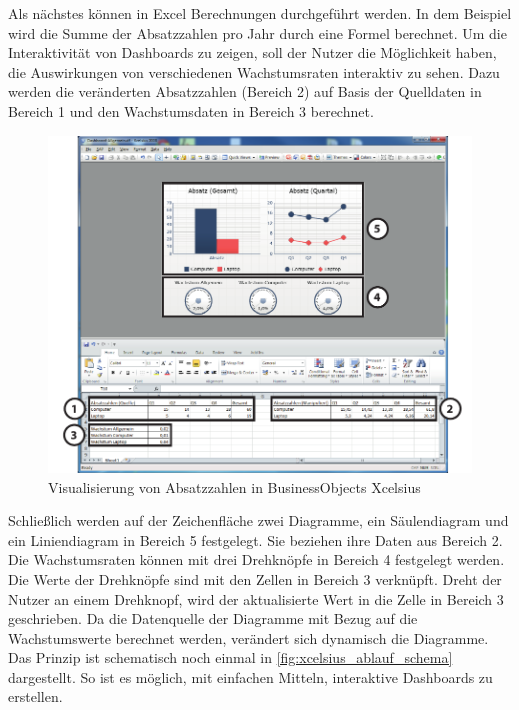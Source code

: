 \begin{onehalfspacing}
Als nächstes können in Excel Berechnungen durchgeführt werden. In dem Beispiel wird die Summe der Absatzzahlen pro Jahr durch eine Formel berechnet. Um die Interaktivität von Dashboards zu zeigen, soll der Nutzer die Möglichkeit haben, die Auswirkungen von verschiedenen Wachstumsraten interaktiv zu sehen. Dazu werden die veränderten Absatzzahlen (Bereich 2) auf Basis der Quelldaten in Bereich 1 und den Wachstumsdaten in Bereich 3 berechnet.

\begin{figure}[!ht]
\centering
\setlength{\unitlength}{1mm}
\includegraphics[width=15cm]{images/Abbildung6-Visualisierung-Absatz-Xcelsius-AI.pdf}
\caption{Visualisierung von Absatzzahlen in BusinessObjects Xcelsius\label{fig:xcelsius_ui_beispiel}}
\end{figure} 

Schließlich werden auf der Zeichenfläche zwei Diagramme, ein Säulendiagram und ein Liniendiagram in Bereich 5 festgelegt. Sie beziehen ihre Daten aus Bereich 2. Die Wachstumsraten können mit drei Drehknöpfe in Bereich 4 festgelegt werden. Die Werte der Drehknöpfe sind mit den Zellen in Bereich 3 verknüpft. Dreht der Nutzer an einem Drehknopf, wird der aktualisierte Wert in die Zelle in Bereich 3 geschrieben. Da die Datenquelle der Diagramme mit Bezug auf die Wachstumswerte berechnet werden, verändert sich dynamisch die Diagramme. Das Prinzip ist schematisch noch einmal in \vref{fig:xcelsius_ablauf_schema} dargestellt. So ist es möglich, mit einfachen Mitteln, interaktive Dashboards zu erstellen.


\end{onehalfspacing}
